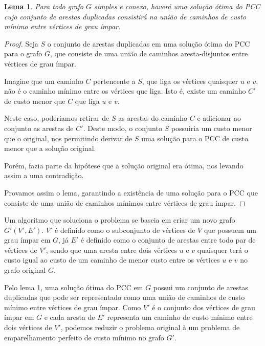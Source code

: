 \documentclass[12pt, a4paper]{article}
\newtheorem{lemma}{Lema}
\begin{document}
\begin{lemma}
    \label{lema-final}
    Para todo grafo $G$ simples e conexo, haverá uma solução ótima do PCC cujo conjunto de arestas duplicadas consistirá na união de caminhos de custo mínimo entre vértices de grau ímpar.
\end{lemma}

\begin{proof}
    Seja $S$ o conjunto de arestas duplicadas em uma solução ótima do PCC para o grafo $G$, que consiste de uma união de caminhos aresta-disjuntos entre vértices de grau ímpar.

    Imagine que um caminho $C$ pertencente a $S$, que liga os vértices quaisquer $u$ e $v$, não é o caminho mínimo entre os vértices que liga. 
    Isto é, existe um caminho $C'$ de custo menor que $C$ que liga $u$ e $v$.

    Neste caso, poderiamos retirar de $S$ as arestas do caminho $C$ e adicionar ao conjunto as arestas de $C'$. Deste modo, o conjunto $S$ possuiria um custo menor que o original, nos permitindo derivar de $S$ uma solução para o PCC de custo menor que a solução original.

    Porém, fazia parte da hipótese que a solução original era ótima, nos levando assim a uma contradição.

    Provamos assim o lema, garantindo a existência de uma solução para o PCC que consiste de uma união de caminhos mínimos entre vértices de grau ímpar.

\end{proof}

Um algoritmo que soluciona o problema se baseia em criar um novo grafo $G'(V', E')$. 
$V'$ é definido como o subconjunto de vértices de $V$ que possuem um grau ímpar em $G$, já $E'$ é definido como o conjunto de arestas entre todo par de vértices de $V'$, sendo que uma aresta entre dois vértices $u$ e $v$ quaisquer terá o custo igual ao custo de um caminho de menor custo entre os vértices $u$ e $v$ no grafo original $G$.


Pelo lema \ref{lema-final}, uma solução ótima do PCC em $G$ possui um conjunto de arestas duplicadas que pode ser representado como uma união de caminhos de custo mínimo entre vértices de grau ímpar. 
Como $V'$ é o conjunto dos vértices de grau ímpar em $G$ e cada aresta de $E'$ representa um caminho de custo mínimo entre dois vértices de $V'$, podemos reduzir o problema original à um problema de emparelhamento perfeito de custo mínimo no grafo $G'$.
\end{document}
